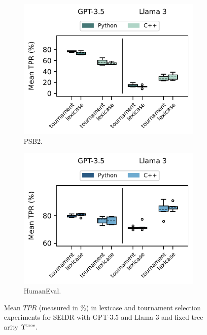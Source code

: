 \begin{figure}
\begin{subfigure}{.48\linewidth}
\centering
\includegraphics[width=\linewidth, trim={0mm 4mm 0mm 0mm}]{images/mean_tpr_lexicase_psb2_6runs_boxplot_v5.pdf}
  \caption{PSB2.}
  \label{fig:mean-tpr-lexicase-selection-psb2}
\end{subfigure}
\begin{subfigure}{.48\linewidth}
\centering
\includegraphics[width=\linewidth, trim={0mm 4mm 0mm 0mm}]{images/mean_tpr_lexicase_humaneval_6runs_boxplot_v5.pdf}
  \caption{HumanEval.}
  \label{fig:mean-tpr-lexicase-selection-he}
\end{subfigure}
\caption{Mean $TPR$ (measured in \%) in lexicase and tournament selection experiments for SEIDR with GPT-3.5 and Llama 3 and fixed tree arity $\Upsilon^\text{tree}.$}
\label{fig:mean-tpr-lexicase-selection}
\end{figure}

